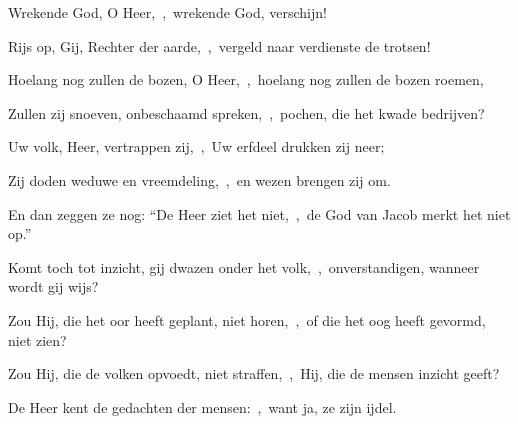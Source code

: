 \documentclass[12pt,twoside,a5paper]{article}
\begin{document}
\begin{halfparskip}

  Wrekende God, O Heer,~\sep\ wrekende God, verschijn!

  Rijs op, Gij, Rechter der aarde,~\sep\ vergeld naar verdienste de trotsen!

  Hoelang nog zullen de bozen, O Heer,~\sep\ hoelang nog zullen de bozen roemen,

  Zullen zij snoeven, onbeschaamd spreken,~\sep\ pochen, die het kwade bedrijven?

  Uw volk, Heer, vertrappen zij,~\sep\ Uw erfdeel drukken zij neer;

  Zij doden weduwe en vreemdeling,~\sep\ en wezen brengen zij om.

  En dan zeggen ze nog: ``De Heer ziet het niet,~\sep\ de God van Jacob merkt het niet op.''
\end{halfparskip}

\begin{halfparskip}

  Komt toch tot inzicht, gij dwazen onder het volk,~\sep\ onverstandigen, wanneer wordt gij wijs?

  Zou Hij, die het oor heeft geplant, niet horen,~\sep\ of die het oog heeft gevormd, niet zien?

  Zou Hij, die de volken opvoedt, niet straffen,~\sep\ Hij, die de mensen inzicht geeft?

  De Heer kent de gedachten der mensen:~\sep\ want ja, ze zijn ijdel.
\end{halfparskip}
\end{document}
